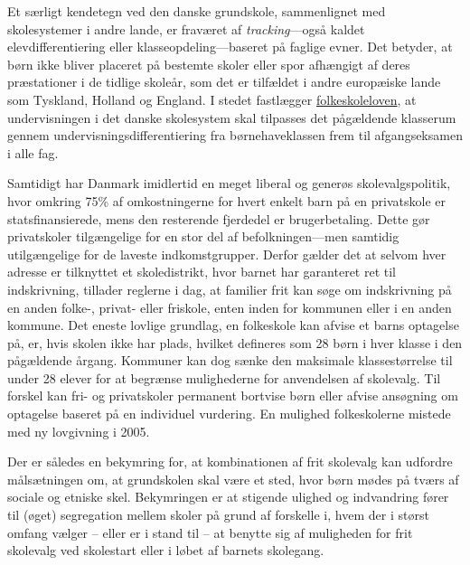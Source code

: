 \documentclass[
]{book}
\begin{document}
Et særligt kendetegn ved den danske grundskole, sammenlignet med skolesystemer i andre lande, er fraværet af \emph{tracking}---også kaldet elevdifferentiering eller klasseopdeling---baseret på faglige evner. Det betyder, at børn ikke bliver placeret på bestemte skoler eller spor afhængigt af deres præstationer i de tidlige skoleår, som det er tilfældet i andre europæiske lande som Tyskland, Holland og England. I stedet fastlægger \href{https://arkiv.emu.dk/sites/default/files/2019-01/Vidensnotat\%20-\%20Undervisningsdifferentiering.pdf}{folkeskoleloven}, at undervisningen i det danske skolesystem skal tilpasses det pågældende klasserum gennem undervisningsdifferentiering fra børnehaveklassen frem til afgangseksamen i alle fag.

Samtidigt har Danmark imidlertid en meget liberal og generøs skolevalgspolitik, hvor omkring 75\% af omkostningerne for hvert enkelt barn på en privatskole er statsfinansierede, mens den resterende fjerdedel er brugerbetaling. Dette gør privatskoler tilgængelige for en stor del af befolkningen---men samtidig utilgængelige for de laveste indkomstgrupper. Derfor gælder det at selvom hver adresse er tilknyttet et skoledistrikt, hvor barnet har garanteret ret til indskrivning, tillader reglerne i dag, at familier frit kan søge om indskrivning på en anden folke-, privat- eller friskole, enten inden for kommunen eller i en anden kommune. Det eneste lovlige grundlag, en folkeskole kan afvise et barns optagelse på, er, hvis skolen ikke har plads, hvilket defineres som 28 børn i hver klasse i den pågældende årgang. Kommuner kan dog sænke den maksimale klassestørrelse til under 28 elever for at begrænse mulighederne for anvendelsen af skolevalg. Til forskel kan fri- og privatskoler permanent bortvise børn eller afvise ansøgning om optagelse baseret på en individuel vurdering. En mulighed folkeskolerne mistede med ny lovgivning i 2005.

Der er således en bekymring for, at kombinationen af frit skolevalg kan udfordre målsætningen om, at grundskolen skal være et sted, hvor børn mødes på tværs af sociale og etniske skel. Bekymringen er at stigende ulighed og indvandring fører til (øget) segregation mellem skoler på grund af forskelle i, hvem der i størst omfang vælger -- eller er i stand til -- at benytte sig af muligheden for frit skolevalg ved skolestart eller i løbet af barnets skolegang.
\end{document}
